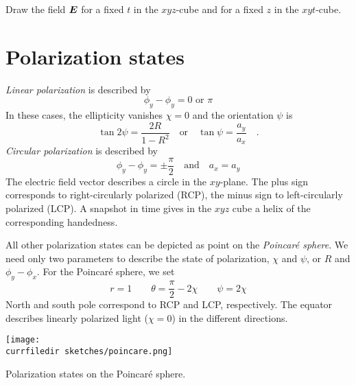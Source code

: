 \begin{questions}
    \item Draw the field $\boldsymbol{E}$ for a fixed $t$ in the $xyz$-cube and for a fixed $z$ in the $xyt$-cube.
\end{questions}


\section{Polarization states}

\emph{Linear polarization} is described by
\begin{equation}
    \phi_y - \phi_y = 0 \text{ or } \pi
\end{equation}
In these cases, the ellipticity vanishes $\chi = 0$ and the orientation $\psi$ is 
\begin{equation}
    \tan 2 \psi = \frac{2R}{1 - R^2} \quad \text{or} \quad \tan \psi = \frac{a_y}{a_x} \quad .
\end{equation} 
%
\emph{Circular polarization} is described by
\begin{equation}
    \phi_y - \phi_y = \pm \frac{\pi}{2} \quad \text{and} \quad a_x = a_y
\end{equation}
The electric field vector describes a circle in the $xy$-plane. The plus sign corresponds to right-circularly polarized (RCP), the minus sign to left-circularly polarized (LCP). A snapshot in time gives in the $xyz$ cube a helix of the corresponding handedness.

All other polarization states can be depicted as point on the \emph{Poincaré sphere}. We need only two parameters to describe the state of polarization, $\chi$ and $\psi$, or $R$ and $\phi_y - \phi_x$. For the Poincaré sphere, we set 
\begin{equation}
    r = 1 \qquad \theta = \frac{\pi}{2} - 2 \chi \qquad \psi = 2 \chi
\end{equation}
North and south pole correspond to RCP and LCP, respectively. The equator describes linearly polarized light ($\chi =  0$) in the different directions.

\begin{marginfigure}
    \texttt{[image: \\currfiledir sketches/poincare.png]}
    \caption{Polarization states on the Poincaré sphere.}
\end{marginfigure}

